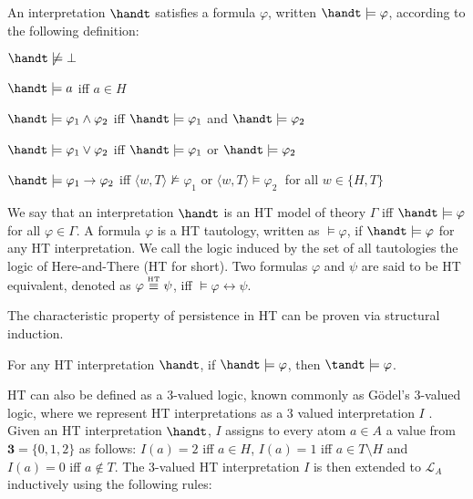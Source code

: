 \begin{definition}[HT satisfaction]
    An interpretation $\handt$ satisfies a formula $\varphi$, written $\handt \models \varphi$, according to the following definition:
    \begin{description}
        \item $\handt \not \models \bot$
        \item $\handt \models a$ iff $a\in H$
        \item $\handt \models \varphi_1 \wedge \varphi_2$ iff $\handt \models \varphi_1$ and  $\handt \models \varphi_2$
        \item $\handt \models \varphi_1 \vee \varphi_2$ iff $\handt \models \varphi_1$ or  $\handt \models \varphi_2$
        \item $\handt \models \varphi_1 \to \varphi_2$ iff $\langle w,T \rangle \not \models \varphi_1$ or  $\langle w,T \rangle \models \varphi_2\;$ for all 
        $w \in \{H,T\}$
    \end{description}
\end{definition}

We say that an interpretation $\handt$ is an HT model of theory
$\Gamma$ iff $\handt \models \varphi$ for all $\varphi \in \Gamma$. A
formula $\varphi$ is a HT tautology, written as $\models \varphi$, if
$\handt \models \varphi$ for any HT interpretation. We call the logic
induced by the set of all tautologies the logic of Here-and-There (HT
for short). Two formulas $\varphi$ and $\psi$ are said to be HT
equivalent, denoted as $\varphi \stackrel{\normalfont\mbox{\tiny HT}}{\equiv} \psi$, iff
$\models \varphi \leftrightarrow \psi$.

The characteristic property of persistence in HT can be proven via
structural induction.

\begin{proposition}[Persistence]
  For any HT interpretation $\handt$, if $\handt \models \varphi$,
  then $\tandt \models \varphi$.
\end{proposition}

HT can also be defined as a 3-valued logic, known commonly as
Gödel's 3-valued logic, where we represent HT interpretations as a 3
valued interpretation $I$ \cite{capeva05a}. Given an HT interpretation
$\handt$, $I$ assigns to every atom $a\in A$ a value from
$\textbf{3}=\{ 0, 1, 2 \}$ as follows: $I(a)=2$ iff $a \in H$,
$I(a)=1$ iff $a \in T \setminus H$ and $I(a)=0$ iff $a \not\in T$. The 3-valued HT
interpretation $I$ is then extended to $\mathcal{L}_A$ inductively using the
following rules:

